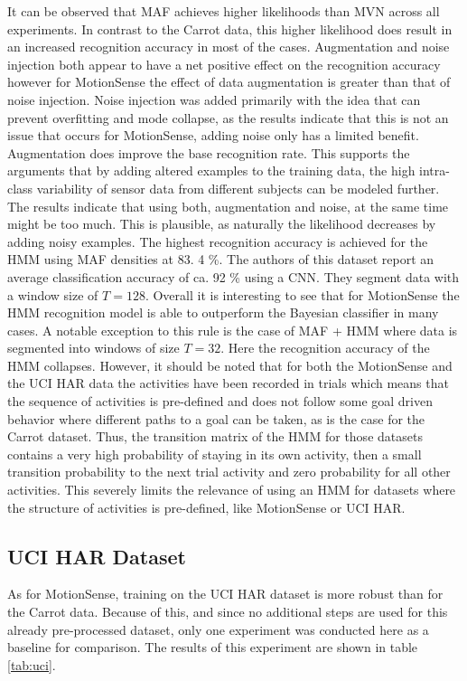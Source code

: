 \documentclass[11pt,titlepage,oneside,openany]{book}
\begin{document}
\noindent It can be observed that MAF achieves higher likelihoods than MVN across all experiments. In contrast to the Carrot data, this higher likelihood does result in an increased recognition accuracy in most of the cases. Augmentation and noise injection both appear to have a net positive effect on the recognition accuracy however for MotionSense the effect of data augmentation is greater than that of noise injection. Noise injection was added primarily with the idea that can prevent overfitting and mode collapse, as the results indicate that this is not an issue that occurs for MotionSense, adding noise only has a limited benefit. Augmentation does improve the base recognition rate. This supports the arguments that by adding altered examples to the training data, the high intra-class variability of sensor data from different subjects can be modeled further. The results indicate that using both, augmentation and noise, at the same time might be too much. This is plausible, as naturally the likelihood decreases by adding noisy examples. The highest recognition accuracy is achieved for the HMM using MAF densities at 83. 4 \%. The authors of this dataset report an average classification accuracy of ca. 92 \% \cite{malekzadeh_mobile_2019} using a CNN. They segment data with a window size of $T=128$. Overall it is interesting to see that for MotionSense the HMM recognition model is able to outperform the Bayesian classifier in many cases. A notable exception to this rule is the case of MAF + HMM where data is segmented into windows of size $T=32$. Here the recognition accuracy of the HMM collapses. However, it should be noted that for both the MotionSense and the UCI HAR data the activities have been recorded in trials which means that the sequence of activities is pre-defined and does not follow some goal driven behavior where different paths to a goal can be taken, as is the case for the Carrot dataset. Thus, the transition matrix of the HMM for those datasets contains a very high probability of staying in its own activity, then a small transition probability to the next trial activity and zero probability for all other activities. This severely limits the relevance of using an HMM for datasets where the structure of activities is pre-defined, like MotionSense or UCI HAR.

\subsection{UCI HAR Dataset}
As for MotionSense, training on the UCI HAR dataset is more robust than for the Carrot data. Because of this, and since no additional steps are used for this already pre-processed dataset, only one experiment was conducted here as a baseline for comparison. The results of this experiment are shown in table \ref{tab:uci}.
\end{document}
